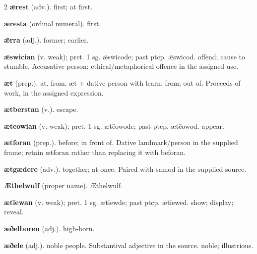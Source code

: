 \begin{multicols*}{2}
\textbf{ǣrest} (adv.). first; at first.\par
\textbf{ǣresta} (ordinal numeral). first.\par
\textbf{ǣrra} (adj.). former; earlier.\par
\textbf{ǣswician} (v. weak); pret. 1 sg. ǣswicode; past ptcp. ǣswicod. offend; cause to stumble. Accusative person; ethical/metaphorical offence in the assigned use.\par
\textbf{æt} (prep.). at. from. æt + dative person with learn. from; out of. Proceeds of work, in the assigned expression.\par
\textbf{ætberstan} (v.). escape.\par
\textbf{ætēowian} (v. weak); pret. 1 sg. ætēowode; past ptcp. ætēowod. appear.\par
\textbf{ætforan} (prep.). before; in front of. Dative landmark/person in the supplied frame; retain ætforan rather than replacing it with beforan.\par
\textbf{ætgædere} (adv.). together; at once. Paired with samod in the supplied source.\par
\textbf{Æthelwulf} (proper name). Æthelwulf.\par
\textbf{ætīewan} (v. weak); pret. 1 sg. ætīewde; past ptcp. ætīewed. show; display; reveal.\par
\textbf{æðelboren} (adj.). high-born.\par
\textbf{æðele} (adj.). noble people. Substantival adjective in the source. noble; illustrious.\par

\end{multicols*}
